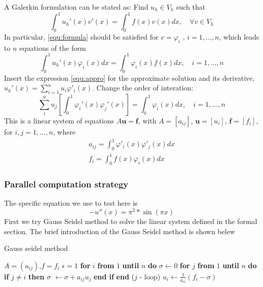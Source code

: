 \documentclass[11pt]{article}
\begin{document}
A Galerkin formulation can be stated as: Find $u_h \in V_h$ such that
\begin{equation}\label{equ:formula}
	\int_0^1u_h'(x)v'(x) = \int_0^1f(x)v(x) dx, \quad \forall v \in V_h 
\end{equation}
In particular, \eqref{equ:formula} should be satisfied for $v = \varphi_i$ , $i = 1,...,n$, which leads to $n$ equations of the form
\begin{equation}
	\int_0^1 u_h'(x)\varphi_i(x)dx = \int_0^1\varphi_i(x)f(x)dx, \quad i = 1,...,n
\end{equation}
Insert the expression \eqref{equ:appro} for the approximate solution and its derivative, $u_h'(x) = \sum_{i=1}^n u_i\varphi'_i(x)$.
Change the order of interation:
\begin{equation}
	\sum_i^n u_j\left[\int_0^1\varphi_i'(x) \varphi_j'(x)\right]= \int_0^1\varphi_i(x) dx, \quad i = 1,...,n
\end{equation}
This is a linear system of equations $A\mathbf{u} = \mathbf{f}$, with $A = [a_{ij}]$, $\mathbf{u} = [u_i]$, $\mathbf{f} = [f_i]$, for $i,j = 1,...,n$, where
\begin{align}
	a_{ij} = \int_0^1\varphi'_i(x)\varphi'_j(x)dx \\
	f_i  = \int_0^1f(x)\varphi_i(x) dx
\end{align}

\subsubsection{Parallel computation strategy}
The specific equation we use to test here
is
\begin{equation}
    -u''(x) = \pi^2*\sin(\pi x)
\end{equation}
First we try Gauss Seidel method to solve the linear system defined in the formal section. The brief introduction of the Gauss Seidel method is shown belew
\begin{algorithm}
\caption{Gauss seidel method}\label{alg:gauss_seidel}
\begin{algorithmic}
\Require $A = (a_{ij})$,$f = f_i$
\State $\epsilon=1$
\State \textbf{for} $i$ \textbf{from} $1$ \textbf{until} $n$ \textbf{do}
\State \quad $\sigma \leftarrow 0$
\State \quad \textbf{for} $j$ \textbf{from} $1$ \textbf{until} $n$ \textbf{do}
\State \quad \quad \textbf{if} $j \neq i$
\textbf{then}
\State \quad  \quad  $\sigma$ $\leftarrow \sigma + a_{ij}u_j$
\State \quad  \quad \textbf{end if}
\State \quad \textbf{end} ($j$ - loop)
\State $u_i \leftarrow \frac{1}{a_{ii}} (f_i - \sigma)$
\EndWhile
\end{algorithmic}
\end{algorithm}
\end{document}

